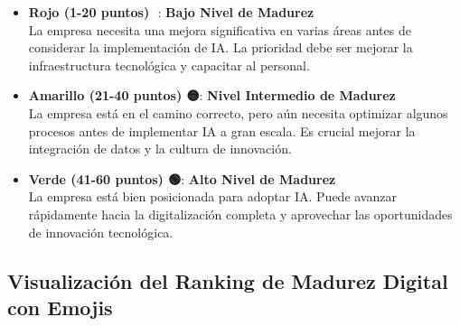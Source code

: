 \documentclass[
  10pt,
  letterpaper,
]{book}
\begin{document}
\begin{itemize}
\item
  \textbf{Rojo (1-20 puntos) 🔴}: \textbf{Bajo Nivel de Madurez}\\
  La empresa necesita una mejora significativa en varias áreas antes de
  considerar la implementación de IA. La prioridad debe ser mejorar la
  infraestructura tecnológica y capacitar al personal.
\item
  \textbf{Amarillo (21-40 puntos) 🟡}: \textbf{Nivel Intermedio de
  Madurez}\\
  La empresa está en el camino correcto, pero aún necesita optimizar
  algunos procesos antes de implementar IA a gran escala. Es crucial
  mejorar la integración de datos y la cultura de innovación.
\item
  \textbf{Verde (41-60 puntos) 🟢}: \textbf{Alto Nivel de Madurez}\\
  La empresa está bien posicionada para adoptar IA. Puede avanzar
  rápidamente hacia la digitalización completa y aprovechar las
  oportunidades de innovación tecnológica.
\end{itemize}

\subsection{Visualización del Ranking de Madurez Digital con
Emojis}\label{visualizaciuxf3n-del-ranking-de-madurez-digital-con-emojis}
\end{document}
